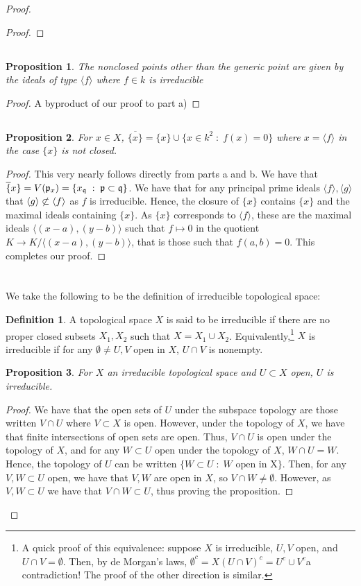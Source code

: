 \documentclass[english]{article}
\newcommand{\pfr}{\mathfrak{p}}
\newcommand{\qfr}{\mathfrak{q}}
\newcommand{\prob}[1]{\setcounter{section}{#1-1}\section{}}
\newcommand{\prt}[1]{\setcounter{subsection}{#1-1}\subsection{}}
\newtheorem*{proposition*}{Proposition}
\theoremstyle{remark}
\theoremstyle{definition}
\newtheorem*{definition*}{Definition}
\newcommand{\idl}[1]{\langle #1 \rangle}
\newcommand{\cl}{\overline}
\begin{document}
\begin{proof}
\begin{proof}
\end{proof}
\prt{2} \begin{proposition*}
The nonclosed points other than the generic point are given by the ideals of type $\idl{f}$ where $f\in k$ is irreducible
\end{proposition*}
\begin{proof}
	A byproduct of our proof to part a)
\end{proof}
\prt{3}\begin{proposition*}
	For $x\in X$, $\cl{\{x\}}=\{x\}\cup\{x\in k^2\;:\; f(x)=0\}$ where $x=\idl{f}$ in the case $\{x\}$ is not closed. 
\end{proposition*}
\begin{proof}
	This very nearly follows directly from parts a and b. We have that $\cl\{x\}=V(\pfr_x)=\{x_\qfr\;:\; \pfr\subset \qfr\}$. We have that for any principal prime ideals $\idl{f},\idl{g}$ that $\idl{g}\centernot\subset\idl{f} $ as $f$ is irreducible. Hence, the closure of $\{x\}$ contains $\{x\}$ and the maximal ideals containing $\{x\}$. As $\{x\}$ corresponds to $\idl{f}$, these are the maximal ideals $\idl{(x-a),(y-b)}$ such that $f\mapsto 0$ in the quotient $K\to K/\idl{(x-a),(y-b)}$, that is those such that $f(a,b)=0$. This completes our proof.
\end{proof}
\prob{6}
We take the following to be the definition of irreducible topological space:
\begin{definition*}
A topological space $X$ is said to be irreducible if there are no proper closed subsets $X_1,X_2$ such that $X=X_1\cup X_2$. Equivalently,\footnote{A quick proof of this equivalence: suppose $X$ is irreducible, $U,V$ open, and $U\cap V=\emptyset$. Then, by de Morgan's laws, $\emptyset^c=X(U\cap V)^c=U^c\cup V^c$\textemdash a contradiction! The proof of the other direction is similar.} $X$ is irreducible if for any $\emptyset \neq U,V$ open in $X$, $U\cap V$ is nonempty.
\end{definition*}
\begin{proposition*}
	For $X$ an irreducible topological space and $U\subset X$ open, $U$ is irreducible.
\end{proposition*}
\begin{proof}
We have that the open sets of $U$ under the subspace topology are those written $V\cap U$ where $V\subset X$ is open. However, under the topology of $X$, we have that finite intersections of open sets are open. Thus, $V\cap U$ is open under the topology of $X$, and for any $W\subset U$ open under the topology of $X$, $W\cap U= W$. Hence, the topology of $U$ can be written $\{W\subset U\;:\;W \text{ open in X}\}$. Then, for any $V,W\subset U$ open, we have that $V,W$ are open in $X$, so $V\cap W\neq \emptyset$. However, as $V,W\subset U$ we have that $V\cap W\subset U$, thus proving the proposition.
\end{proof}


\end{proof}
\end{document}
